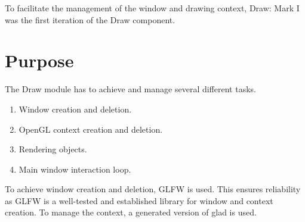 
To facilitate the management of the window and drawing context, Draw: Mark I was
the first iteration of the Draw component.

\section{Purpose}

The Draw module has to achieve and manage several different tasks.

\begin{enumerate}
    \item Window creation and deletion.
    \item OpenGL context creation and deletion.
    \item Rendering objects.
    \item Main window interaction loop.
\end{enumerate}

To achieve window creation and deletion, GLFW is used. This ensures reliability
as GLFW is a well-tested and established library for window and context
creation. To manage the context, a generated version of glad is used.
